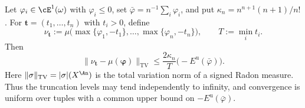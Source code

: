 \noindent\begin{minipage}{\linewidth}
\begin{proposition}\label{prop:cma-finite-energy-truncation}
Let $\varphi_i\in\cE^1(\omega)$ with $\varphi_i\leq0$, set $\bar\varphi=n^{-1}\sum_i\varphi_i$, and put $\kappa_n=n^{n+1}(n+1)/n!$. For $\boldsymbol t=(t_1,\ldots,t_n)$ with $t_i>0$, define
\[
 \nu_{\boldsymbol t}
       :=\mu\bigl(\max\{\varphi_1,-t_1\},\ldots,
                  \max\{\varphi_n,-t_n\}\bigr),
 \qquad T:=\min_i t_i.
\]
Then
\[
 \|\nu_{\boldsymbol t}-\mu(\boldsymbol\varphi)\|_{\mathrm{TV}}
       \leq\frac{2\kappa_n}{T}\bigl(-E^{\mathrm u}(\bar\varphi)\bigr).
\tag{64.31}\label{eq:cma-truncation-variation}
\]
Here $\|\sigma\|_{\mathrm{TV}}=|\sigma|(X^{\An})$ is the total variation norm of a signed Radon measure. Thus the truncation levels may tend independently to infinity, and convergence is uniform over tuples with a common upper bound on $-E^{\mathrm u}(\bar\varphi)$.
\end{proposition}
\end{minipage}\par

